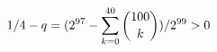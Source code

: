 \documentclass[preview]{standalone}
\begin{document}
\begin{align*}
\special{dvisvgm:raw <g id='unique000'>}1/4-q=(2^{97}-\sum_{k=0}^{40}\binom{100}{k})/2^{99}>0\special{dvisvgm:raw </g>}
\end{align*}
\end{document}
